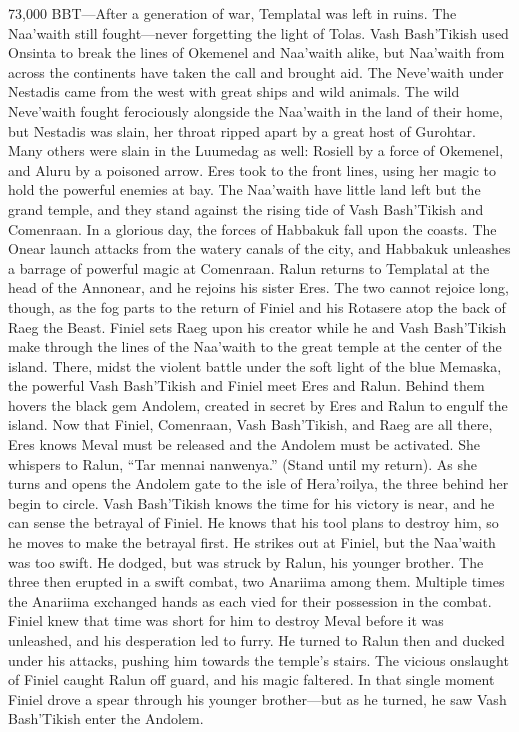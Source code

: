 \documentclass[smalldemyvopaper,11pt,twoside,onecolumn,openright,extrafontsizes]{memoir}
\begin{document}
{{73,000 BBT—After a generation of war, Templatal was left in ruins. The Naa’waith still fought—never forgetting the light of Tolas. Vash Bash’Tikish used Onsinta to break the lines of Okemenel and Naa’waith alike, but Naa’waith from across the continents have taken the call and brought aid. The Neve’waith under Nestadis came from the west with great ships and wild animals. The wild Neve’waith fought ferociously alongside the Naa’waith in the land of their home, but Nestadis was slain, her throat ripped apart by a great host of Gurohtar. Many others were slain in the Luumedag as well: Rosiell by a force of Okemenel, and Aluru by a poisoned arrow. Eres took to the front lines, using her magic to hold the powerful enemies at bay. The Naa’waith have little land left but the grand temple, and they stand against the rising tide of Vash Bash’Tikish and Comenraan. In a glorious day, the forces of Habbakuk fall upon the coasts. The Onear launch attacks from the watery canals of the city, and Habbakuk unleashes a barrage of powerful magic at Comenraan. Ralun returns to Templatal at the head of the Annonear, and he rejoins his sister Eres. The two cannot rejoice long, though, as the fog parts to the return of Finiel and his Rotasere atop the back of Raeg the Beast. Finiel sets Raeg upon his creator while he and Vash Bash’Tikish make through the lines of the Naa’waith to the great temple at the center of the island. There, midst the violent battle under the soft light of the blue Memaska, the powerful Vash Bash’Tikish and Finiel meet Eres and Ralun. Behind them hovers the black gem Andolem, created in secret by Eres and Ralun to engulf the island. Now that Finiel, Comenraan, Vash Bash’Tikish, and Raeg are all there, Eres knows Meval must be released and the Andolem must be activated. She whispers to Ralun, “Tar mennai nanwenya.” (Stand until my return).
As she turns and opens the Andolem gate to the isle of Hera’roilya, the three behind her begin to circle. Vash Bash’Tikish knows the time for his victory is near, and he can sense the betrayal of Finiel. He knows that his tool plans to destroy him, so he moves to make the betrayal first. He strikes out at Finiel, but the Naa’waith was too swift. He dodged, but was struck by Ralun, his younger brother. The three then erupted in a swift combat, two Anariima among them. Multiple times the Anariima exchanged hands as each vied for their possession in the combat. Finiel knew that time was short for him to destroy Meval before it was unleashed, and his desperation led to furry. He turned to Ralun then and ducked under his attacks, pushing him towards the temple’s stairs. The vicious onslaught of Finiel caught Ralun off guard, and his magic faltered. In that single moment Finiel drove a spear through his younger brother—but as he turned, he saw Vash Bash’Tikish enter the Andolem.
}}
\end{document}
